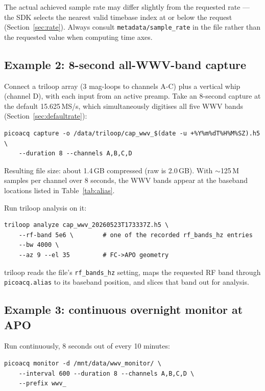 \documentclass[11pt]{article}
\begin{document}
The actual achieved sample rate may differ slightly from the
requested rate --- the SDK selects the nearest valid timebase index
at or below the request (Section~\ref{sec:rate}).  Always consult
\texttt{metadata/sample\_rate} in the file rather than the requested
value when computing time axes.

\subsection{Example 2: 8-second all-WWV-band capture}

Connect a triloop array (3 mag-loops to channels A-C) plus a vertical
whip (channel D), with each input from an active preamp.  Take an
8-second capture at the default 15.625\,MS/s, which simultaneously
digitises all five WWV bands (Section~\ref{sec:defaultrate}):

\begin{lstlisting}[style=shell]
picoacq capture -o /data/triloop/cap_wwv_$(date -u +%Y%m%dT%H%M%SZ).h5 \
    --duration 8 --channels A,B,C,D
\end{lstlisting}

Resulting file size: about 1.4\,GB compressed (raw is 2.0\,GB).
With $\sim$125\,M samples per channel over 8 seconds, the WWV bands
appear at the baseband locations listed in Table~\ref{tab:alias}.

Run \textsf{triloop} analysis on it:

\begin{lstlisting}[style=shell]
triloop analyze cap_wwv_20260523T173337Z.h5 \
    --rf-band 5e6 \        # one of the recorded rf_bands_hz entries
    --bw 4000 \
    --az 9 --el 35         # FC->APO geometry
\end{lstlisting}

\textsf{triloop} reads the file's \texttt{rf\_bands\_hz} setting,
maps the requested RF band through \texttt{picoacq.alias} to its
baseband position, and slices that band out for analysis.

\subsection{Example 3: continuous overnight monitor at APO}

Run continuously, 8 seconds out of every 10 minutes:

\begin{lstlisting}[style=shell]
picoacq monitor -d /mnt/data/wwv_monitor/ \
    --interval 600 --duration 8 --channels A,B,C,D \
    --prefix wwv_
\end{lstlisting}
\end{document}
